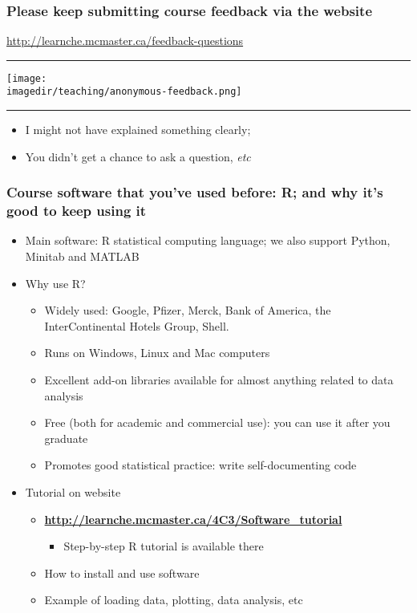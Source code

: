 \begin{frame}\frametitle{Please keep submitting course feedback via the website}
	
	\href{http://learnche.mcmaster.ca/feedback-questions}{http://learnche.mcmaster.ca/feedback-questions}
	\vspace{4pt}
	\hrule
	\begin{center}
		\texttt{[image: \\imagedir/teaching/anonymous-feedback.png]}
	\end{center}
	\hrule
	\begin{itemize}
		\item	I might not have explained something clearly;
		\item	You didn't get a chance to ask a question, \emph{etc}
	\end{itemize}
	
\end{frame}

\begin{frame}\frametitle{Course software that you've used before: R; and why it's good to keep using it}
	\begin{itemize}
		\item	Main software: R statistical computing language; we also support Python, Minitab and MATLAB
	\end{itemize}
	\begin{itemize}
		\item	Why use R?
		\begin{itemize}
			\item	Widely used: Google, Pfizer, Merck, Bank of America, the InterContinental Hotels Group, Shell.
			\item	Runs on Windows, Linux and Mac computers
			\item	Excellent add-on libraries available for almost anything related to data analysis
			\item	Free (both for academic and commercial use): you can use it after you graduate
			\item	Promotes good statistical practice: write self-documenting code
		\end{itemize}
	\end{itemize}
	\begin{itemize}
		\item	Tutorial on website
		\begin{itemize}
			\item	\textbf{\href{http://learnche.mcmaster.ca/4C3/Software\_tutorial}{http://learnche.mcmaster.ca/4C3/Software\_tutorial}}
			\begin{itemize}
				\item	Step-by-step R tutorial is available there
			\end{itemize}
			\item	How to install and use software
			\item	Example of loading data, plotting, data analysis, etc
		\end{itemize}
	\end{itemize}
\end{frame}

